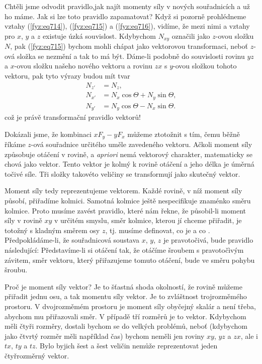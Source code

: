     Chtěli jsme odvodit pravidlo,jak najít momenty síly v nových souřadnicích a už ho máme. Jak si
    lze toto pravidlo zapamatovat? Když si pozorně prohlédneme vztahy (\ref{fyz:eq714}),
    (\ref{fyz:eq715}) a (\ref{fyz:eq716}), vidíme, že mezi nimi a vztahy pro \(x\), \(y\) a \(z\)
    existuje úzká souvislost. Kdybychom \(N_{xy}\) označili jako \(z\)-ovou složku \(N\), pak
    (\ref{fyz:eq715}) bychom mohli chápat jako vektorovou transformaci, neboť \(z\)-ová složka se
    nezmění a tak to má být. Dáme-li podobně do souvislosti rovinu \(yz\) a \(x\)-ovou složku našeho
    nového vektoru a rovinu \(zx\) s \(y\)-ovou složkou tohoto vektoru, pak tyto výrazy budou mít
    tvar
    \begin{subequations}\label{fyz:eq717}
      \begin{align}
        N_{z'} &=  N_z,                           \label{fyz:eq717a}  \\
        N_{x'} &=  N_x\cos\Theta + N_y\sin\Theta, \label{fyz:eq717b}  \\
        N_{y'} &=  N_y\cos\Theta - N_x\sin\Theta. \label{fyz:eq717c}        
      \end{align}
    \end{subequations} 
    což je právě transformační pravidlo vektorů!

    Dokázali jsme, že kombinaci \(xF_y - yF_x\) můžeme ztotožnit s tím, čemu běžně říkáme \(z\)-ová
    souřadnice určitého uměle zavedeného vektoru. Ačkoli moment síly způsobuje otáčení v rovině, a
    \emph{apriori} nemá vektorový charakter, matematicky se chová jako vektor. Tento vektor je kolmý
    k rovině otáčení a jeho délka je úměrná točivé síle. Tři složky takovéto veličiny se
    transformují jako skutečný vektor.

    Moment síly tedy reprezentujeme vektorem. Každé rovině, v níž moment síly působí, přiřadíme
    kolmici. Samotná kolmice ještě nespecifikuje znaménko směru kolmice. Proto musíme zavést
    pravidlo, které nám řekne, že působil-li moment síly v rovině \(xy\) v určitém smyslu, směr
    kolmice, kterou jí chceme přiřadit, je totožný s kladným směrem osy \(z\), tj. musíme definovat,
    co je  a co . Předpokládáme-li, že souřadnicová soustava \(x\), \(y\), \(z\)
    je pravotočivá, bude pravidlo následující: Představíme-li si otáčení tak, že otáčíme šroubem s
    pravotočìvým závitem, směr vektoru, který přiřazujeme tomuto otáčení, bude ve směru pohybu
    šroubu.

    Proč je moment síly vektor? Je to šťastná shoda okolností, že rovině můžeme přiřadit jednu osu,
    a tak momentu síly vektor. Je to zvláštnost trojrozměmého prostoru. V dvojrozměmém prostoru je
    moment síly obyčejný skalár a není třeba, abychom mu přiřazovali směr. V případě tří rozměrů je
    to vektor. Kdybychom měli čtyři rozměry, dostali bychom se do velkých problémů, neboť (kdybychom
    jako čtvrtý rozměr měli například čas) bychom neměli jen roviny \(xy\), \(yz\) a \(zx\), ale i
    \(tx\), \(ty\) a \(tz\). Bylo byjich šest a šest veličin nemůže reprezentovat jeden čtyřrozměrný
    vektor.

